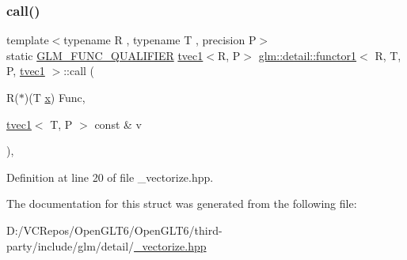 \subsubsection{\texorpdfstring{call()}{call()}}
{\footnotesize\ttfamily template$<$typename R , typename T , precision P$>$ \\
static \mbox{\hyperlink{setup_8hpp_a33fdea6f91c5f834105f7415e2a64407}{G\+L\+M\+\_\+\+F\+U\+N\+C\+\_\+\+Q\+U\+A\+L\+I\+F\+I\+ER}} \mbox{\hyperlink{structglm_1_1tvec1}{tvec1}}$<$R, P$>$ \mbox{\hyperlink{structglm_1_1detail_1_1functor1}{glm\+::detail\+::functor1}}$<$ R, T, P, \mbox{\hyperlink{structglm_1_1tvec1}{tvec1}} $>$\+::call (\begin{DoxyParamCaption}\item[{R($\ast$)(T \mbox{\hyperlink{glad_8h_a92d0386e5c19fb81ea88c9f99644ab1d}{x}})}]{Func,  }\item[{\mbox{\hyperlink{structglm_1_1tvec1}{tvec1}}$<$ T, P $>$ const \&}]{v }\end{DoxyParamCaption})\hspace{0.3cm}{\ttfamily [inline]}, {\ttfamily [static]}}



Definition at line 20 of file \+\_\+vectorize.\+hpp.



The documentation for this struct was generated from the following file\+:\begin{DoxyCompactItemize}
\item 
D\+:/\+V\+C\+Repos/\+Open\+G\+L\+T6/\+Open\+G\+L\+T6/third-\/party/include/glm/detail/\mbox{\hyperlink{__vectorize_8hpp}{\+\_\+vectorize.\+hpp}}\end{DoxyCompactItemize}
